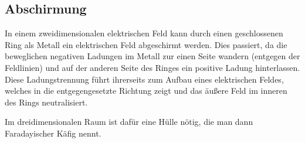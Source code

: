 




%
%	





\subsection{Abschirmung}
In einem zweidimensionalen elektrischen Feld kann durch einen geschlossenen Ring als Metall ein elektrischen Feld abgeschirmt werden. Dies passiert, da die beweglichen negativen Ladungen im Metall zur einen Seite wandern (entgegen der Feldlinien) und auf der anderen Seite des Ringes ein positive Ladung hinterlassen. Diese Ladungstrennung führt ihrerseits zum Aufbau eines elektrischen Feldes, welches in die entgegengesetzte Richtung zeigt und das \glqq äußere\grqq{} Feld im inneren des Rings neutralisiert. 

Im dreidimensionalen Raum ist dafür eine Hülle nötig, die man dann \glqq Faradayischer Käfig\grqq{} nennt.